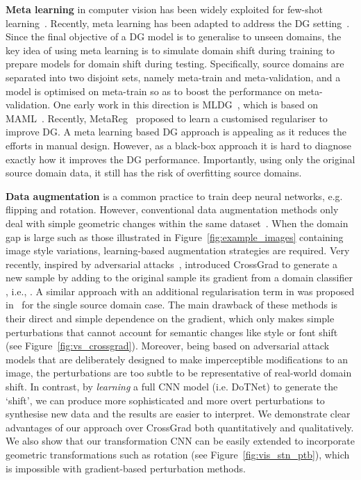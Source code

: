 \documentclass[letterpaper]{article}
\newcommand{\keypoint}[1]{\vspace{0.1cm}\noindent\textbf{#1}}
\begin{document}
\keypoint{Meta learning} in computer vision has been widely exploited for few-shot learning~\cite{finn2017model}. Recently, meta learning has been adapted to address the DG setting~\cite{li2018learning,balaji2018metareg}. Since the final objective of a DG model is to generalise to unseen domains, the key idea of using meta learning is to simulate domain shift during training to prepare models for domain shift during testing. Specifically, source domains are separated into two disjoint sets, namely meta-train and meta-validation, and a model is optimised on meta-train so as to boost the performance on meta-validation. One early work in this direction is MLDG~\cite{li2018learning}, which is based on MAML~\cite{finn2017model}. Recently, MetaReg~\cite{balaji2018metareg} proposed to learn a customised regulariser to improve DG. A meta learning based DG approach is appealing as it reduces the efforts in manual design. However, as a black-box approach it is hard to diagnose exactly how it improves the DG performance. Importantly, using only the original source domain data, it still has the risk of overfitting source domains.

\keypoint{Data augmentation} is a common practice to train deep neural networks, e.g. flipping and rotation. However, conventional data augmentation methods only deal with simple geometric changes within the same dataset~\cite{volpi2019model}. When the domain gap is large such as those illustrated in Figure~\ref{fig:example_images} containing image style variations, learning-based augmentation strategies are required. Very recently, inspired by adversarial attacks~\cite{goodfellow2015explaining}, \cite{shankar2018generalizing} introduced CrossGrad to generate a new sample  by adding to the original sample its gradient from a domain classifier , i.e., . A similar approach with an additional regularisation term in  was proposed in~\cite{volpi2018generalizing} for the single source domain case. The main drawback of these methods is their direct and simple dependence on the gradient, which only makes simple perturbations that cannot account for semantic changes like style or font shift (see Figure~\ref{fig:vs_crossgrad}). Moreover, being based on adversarial attack models that are deliberately designed to make imperceptible modifications to an image, the perturbations are too subtle to be representative of real-world domain shift. In contrast, by \emph{learning} a full CNN model (i.e. DoTNet) to generate the `shift', we can produce more sophisticated and more overt perturbations to synthesise new data and the results are easier to interpret. We demonstrate clear advantages of our approach over CrossGrad both quantitatively and qualitatively. We also show that our transformation CNN can be easily extended to incorporate geometric transformations such as rotation (see Figure~\ref{fig:vis_stn_ptb}), which is impossible with gradient-based perturbation methods.
\end{document}

